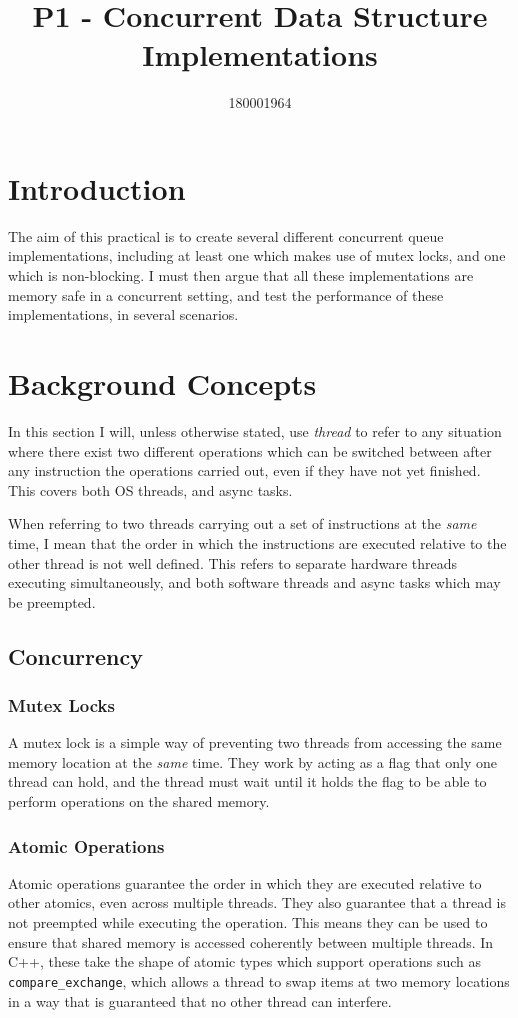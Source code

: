 \documentclass{article}
\title{P1 - Concurrent Data Structure Implementations}
\author{180001964}
\begin{document}
\maketitle

\section{Introduction}
The aim of this practical is to create several different concurrent queue
implementations, including at least one which makes use of mutex locks, and one
which is non-blocking. I must then argue that all these implementations are
memory safe in a concurrent setting, and test the performance of these
implementations, in several scenarios.

\section{Background Concepts}
In this section I will, unless otherwise stated, use \textit{thread} to refer to
any situation where there exist two different operations which can be switched
between after any instruction the operations carried out, even if they have not yet
finished. This covers both OS threads, and async tasks. 

When referring to two threads carrying out a set of instructions at the
\textit{same} time, I mean that the order in which the instructions are executed
relative to the other thread is not well defined. This refers to separate
hardware threads executing simultaneously, and both software threads and async tasks
which may be preempted.

\subsection{Concurrency}
\subsubsection{Mutex Locks}
A mutex lock is a simple way of preventing two threads from accessing the same
memory location at the \textit{same} time. They work by acting as a flag that
only one thread can hold, and the thread must wait until it holds the flag to
be able to perform operations on the shared memory.

\subsubsection{Atomic Operations}
Atomic operations guarantee the order in which they are executed relative to
other atomics, even across multiple threads. They also guarantee that a thread
is not preempted while executing the operation. This means they can be used to
ensure that shared memory is accessed coherently between multiple threads. In
C++, these take the shape of atomic types which support operations such as
\verb|compare_exchange|, which allows a thread to swap items at two memory
locations in a way that is guaranteed that no other thread can interfere.
\end{document}
